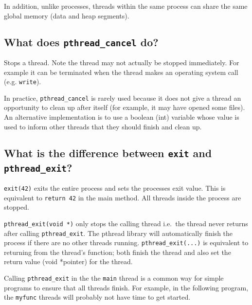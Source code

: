 In addition, unlike processes, threads within the same process can share
the same global memory (data and heap segments).

\subsection{\texorpdfstring{What does \texttt{pthread\_cancel}
do?}{What does pthread\_cancel do?}}\label{what-does-pthreadux5fcancel-do}

Stops a thread. Note the thread may not actually be stopped immediately.
For example it can be terminated when the thread makes an operating
system call (e.g. \texttt{write}).

In practice, \texttt{pthread\_cancel} is rarely used because it does not
give a thread an opportunity to clean up after itself (for example, it
may have opened some files). An alternative implementation is to use a
boolean (int) variable whose value is used to inform other threads that
they should finish and clean up.

\subsection{\texorpdfstring{What is the difference between \texttt{exit}
and
\texttt{pthread\_exit}?}{What is the difference between exit and pthread\_exit?}}\label{what-is-the-difference-between-exit-and-pthreadux5fexit}

\texttt{exit(42)} exits the entire process and sets the processes exit
value. This is equivalent to \texttt{return\ 42} in the main method. All
threads inside the process are stopped.

\texttt{pthread\_exit(void\ *)} only stops the calling thread i.e.~the
thread never returns after calling \texttt{pthread\_exit}. The pthread
library will automatically finish the process if there are no other
threads running. \texttt{pthread\_exit(...)} is equivalent to returning
from the thread's function; both finish the thread and also set the
return value (void *pointer) for the thread.

Calling \texttt{pthread\_exit} in the the \texttt{main} thread is a
common way for simple programs to ensure that all threads finish. For
example, in the following program, the \texttt{myfunc} threads will
probably not have time to get started.

\begin{Shaded}
\begin{Highlighting}[]
 
  \NormalTok{);}
  \NormalTok{);}
  \NormalTok{); }

\NormalTok{\}}
\end{Highlighting}
\end{Shaded}

